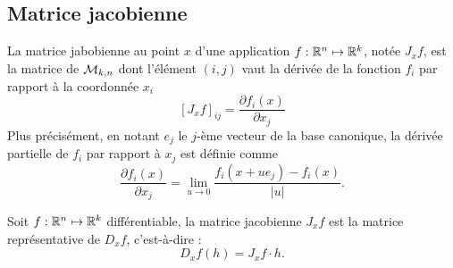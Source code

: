 \subsection{Matrice jacobienne} 

\begin{definition} \label{def:matriceJacobienne}
  La matrice jabobienne au point $x$ d'une application $f : \mathbb{R}^n \mapsto \mathbb{R}^k$, notée $J_xf$, est la matrice de $\mathcal{M}_{k, n}$ dont l'élément $(i, j)$ vaut la dérivée de la fonction $f_i$ par rapport à la coordonnée $x_i$
  $$
  [J_xf]_{ij} 
  = \frac{\partial f_i(x)}{\partial x_j}
  $$
  Plus précisément, en notant $e_j$ le $j$-ème vecteur de la base canonique, 
  la dérivée partielle de $f_i$ par rapport à $x_j$ est définie comme
  $$
  \frac{\partial f_i(x)}{\partial x_j} 
  = \lim_{u \to 0} \frac{f_i(x + u e_j) - f_i(x)}{|u|}.
  $$
\end{definition}

\begin{proposition} \label{prop:matriceJacobienne}
  Soit $f : \mathbb{R}^n \mapsto \mathbb{R}^k$ différentiable, la matrice jacobienne $J_xf$ est la matrice représentative de $D_xf$, c'est-à-dire :
  $$
  D_xf(h) = J_xf \cdot h.
  $$
\end{proposition}

